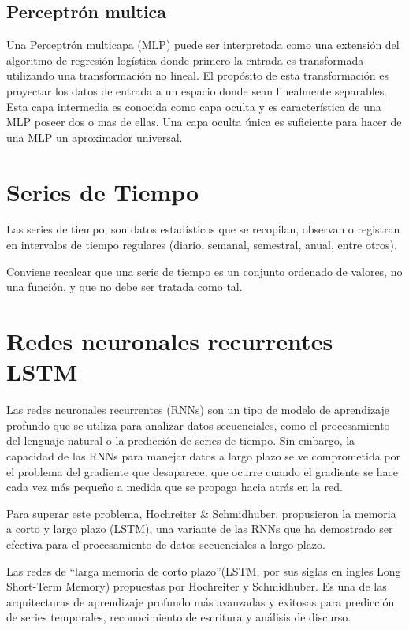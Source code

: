 \subsection{Perceptrón multica}
Una Perceptrón multicapa (MLP) puede ser interpretada como una extensión del algoritmo de regresión logística donde primero la entrada es transformada utilizando una transformación no lineal\cite{de2014aprendizaje}. El propósito de esta transformación es proyectar los datos de entrada a un espacio donde sean linealmente separables.
Esta capa intermedia es conocida como capa oculta y es característica de una MLP poseer dos o mas de ellas. Una capa oculta única es suficiente para hacer de una MLP un aproximador universal.

\section{Series de Tiempo}
Las series de tiempo, son datos estadísticos que se recopilan, observan o registran en intervalos de tiempo regulares (diario, semanal, semestral, anual, entre otros)\cite{herrera2020prediccion}. 

Conviene recalcar que una serie de tiempo es un conjunto ordenado de valores, no una función, y que no debe ser tratada como tal\cite{nava2015procesamiento}.


\section{Redes neuronales recurrentes LSTM}

Las redes neuronales recurrentes (RNNs) son un tipo de modelo de aprendizaje profundo que se utiliza para analizar datos secuenciales, como el procesamiento del lenguaje natural o la predicción de series de tiempo\cite{tomas2023prediccion}. Sin embargo, la capacidad de las RNNs para manejar datos a largo plazo se ve comprometida por el problema del gradiente que desaparece, que ocurre cuando el gradiente se hace cada vez más pequeño a medida que se propaga hacia atrás en la red.

Para  superar  este  problema,  Hochreiter \& Schmidhuber,  propusieron  la  memoria  a  corto  y  largo  plazo  (LSTM),  una  variante  de  las  RNNs  que  ha  demostrado  ser efectiva para el procesamiento de datos secuenciales a largo plazo\cite{tomas2023prediccion}.

Las redes de “larga memoria de corto plazo”(LSTM, por sus siglas en ingles Long Short-Term Memory) propuestas por Hochreiter y Schmidhuber. Es una de las arquitecturas de aprendizaje profundo más avanzadas y exitosas para predicción de series temporales, reconocimiento de escritura y análisis de discurso\cite{fernandez2021estimacion}.


